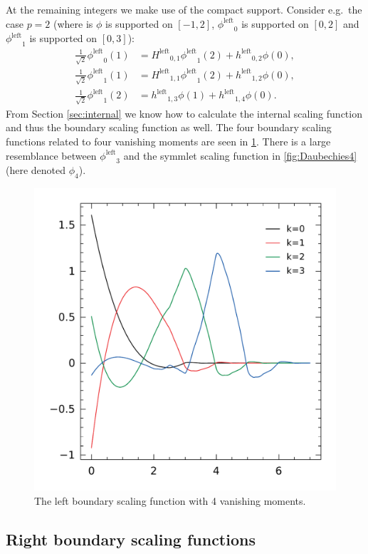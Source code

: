 \documentclass[a4paper]{scrartcl}
\newcommand\lphi{\ensuremath{\phi^{\text{left}}}}
\newcommand\lH{\ensuremath{H^{\text{left}}}}
\newcommand\lh{\ensuremath{h^{\text{left}}}}
\begin{document}
At the remaining integers we make use of the compact support.
Consider e.g.\ the case $p=2$ (where is $\phi$ is supported on $[-1,2]$, $\lphi_0$ is supported on $[0,2]$ and $\lphi_1$ is supported on $[0,3]$):
\begin{align*}
	\frac1{\sqrt2} \lphi_0(1)
	& = \lH_{0,1} \lphi_1(2) + \lh_{0,2} \phi(0),
	\\
	\frac1{\sqrt2} \lphi_1(1)
	& = \lH_{1,1} \lphi_1(2) + \lh_{1,2} \phi(0),
	\\
	\frac1{\sqrt2} \lphi_1(2)
	& = \lh_{1,3} \phi(1) + \lh_{1,4} \phi(0).
\end{align*}
From Section \ref{sec:internal} we know how to calculate the internal scaling function and thus the boundary scaling function as well.
The four boundary scaling functions related to four vanishing moments are seen in \cref{fig:left_Daubechies4}.
There is a large resemblance between $\lphi_3$ and the symmlet scaling function in \cref{fig:Daubechies4} (here denoted $\phi_4$).

\begin{figure}
	\centering
	\includegraphics[scale=0.5]{left}
	\caption{The left boundary scaling function with 4 vanishing moments.}
	\label{fig:left_Daubechies4}
\end{figure}


\subsection{Right boundary scaling functions}
\end{document}
